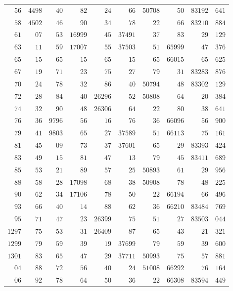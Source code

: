 \begin{longtable}{@{}r|r|r|r|r|r|r|r|r|r@{}}
$56$ & $4498$ & $40$ & $82$ & $24$ & $66$ & $50708$ & $50$ & $83192$ & $641$\\
$58$ & $4502$ & $46$ & $90$ & $34$ & $78$ & $22$ & $66$ & $83210$ & $884$\\
$61$ & $07$ & $53$ & $16999$ & $45$ & $37491$ & $37$ & $83$ & $29$ & $129$\\
$63$ & $11$ & $59$ & $17007$ & $55$ & $37503$ & $51$ & $65999$ & $47$ & $376$\\
$65$ & $15$ & $65$ & $15$ & $65$ & $15$ & $65$ & $66015$ & $65$ & $625$\\
$67$ & $19$ & $71$ & $23$ & $75$ & $27$ & $79$ & $31$ & $83283$ & $876$\\
$70$ & $24$ & $78$ & $32$ & $86$ & $40$ & $50794$ & $48$ & $83302$ & $129$\\
$72$ & $28$ & $84$ & $40$ & $26296$ & $52$ & $50808$ & $64$ & $20$ & $384$\\
$74$ & $32$ & $90$ & $48$ & $26306$ & $64$ & $22$ & $80$ & $38$ & $641$\\
$76$ & $36$ & $9796$ & $56$ & $16$ & $76$ & $36$ & $66096$ & $56$ & $900$\\
$79$ & $41$ & $9803$ & $65$ & $27$ & $37589$ & $51$ & $66113$ & $75$ & $161$\\
$81$ & $45$ & $09$ & $73$ & $37$ & $37601$ & $65$ & $29$ & $83393$ & $424$\\
$83$ & $49$ & $15$ & $81$ & $47$ & $13$ & $79$ & $45$ & $83411$ & $689$\\
$85$ & $53$ & $21$ & $89$ & $57$ & $25$ & $50893$ & $61$ & $29$ & $956$\\
$88$ & $58$ & $28$ & $17098$ & $68$ & $38$ & $50908$ & $78$ & $48$ & $225$\\
$90$ & $62$ & $34$ & $17106$ & $78$ & $50$ & $22$ & $66194$ & $66$ & $496$\\
$93$ & $66$ & $40$ & $14$ & $88$ & $62$ & $36$ & $66210$ & $83484$ & $769$\\
$95$ & $71$ & $47$ & $23$ & $26399$ & $75$ & $51$ & $27$ & $83503$ & $044$\\
$1297$ & $75$ & $53$ & $31$ & $26409$ & $87$ & $65$ & $43$ & $21$ & $321$\\
$1299$ & $79$ & $59$ & $39$ & $19$ & $37699$ & $79$ & $59$ & $39$ & $600$\\
$1301$ & $83$ & $65$ & $47$ & $29$ & $37711$ & $50993$ & $75$ & $57$ & $881$\\
$04$ & $88$ & $72$ & $56$ & $40$ & $24$ & $51008$ & $66292$ & $76$ & $164$\\
$06$ & $92$ & $78$ & $64$ & $50$ & $36$ & $22$ & $66308$ & $83594$ & $449$\\

\end{longtable}
